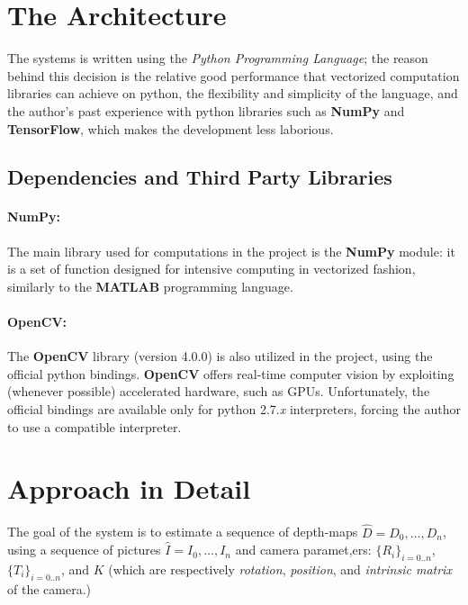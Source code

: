 \documentclass[notitlepage,english]{hgbreport}
\begin{document}
\section{The Architecture}
The systems is written using the \emph{Python Programming Language}; the reason behind this decision is the relative good performance that vectorized computation libraries can achieve on python, the flexibility and simplicity of the language, and the author's past experience with python libraries such as \textbf{NumPy} and \textbf{TensorFlow}, which makes the development less laborious.

\subsection{Dependencies and Third Party Libraries}
\paragraph{NumPy:} The main library used for computations in the project is the \textbf{NumPy} module: it is a set of function designed for intensive computing in vectorized fashion, similarly to the \textbf{MATLAB} programming language.

\paragraph{OpenCV:}
The \textbf{OpenCV} library (version 4.0.0) is also utilized in the project, using the official python bindings.
\textbf{OpenCV} offers real-time computer vision by exploiting (whenever possible) accelerated hardware, such as GPUs.
Unfortunately, the official bindings are available only for python 2.7.\textit{x} interpreters, forcing the author to use a compatible interpreter.




\section{Approach in Detail}
 
 The goal of the system is to estimate a sequence of depth-maps $\hat D = D_0, \dots, D_n$, using a sequence of pictures $\hat I = I_0, \dots, I_n$ and camera paramet,ers: $\{R_i\}_{i=0..n}$, $\{T_i\}_{i=0..n}$, and $K$ (which are respectively  \emph{rotation}, \emph{position}, and \emph{intrinsic matrix} of the camera.)
 
\end{document}
